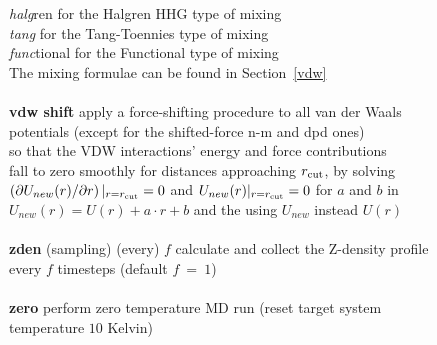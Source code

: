 \begin{tabbing}
\>                                              \> \phantom{x} {\em halg}ren for the Halgren HHG type of mixing \\
\>                                              \> \phantom{x} {\em tang} for the Tang-Toennies type of mixing \\
\>                                              \> \phantom{x} {\em func}tional for the Functional type of mixing \\
\>                                              \> The mixing formulae can be found in Section~\ref{vdw} \\
\>                                              \> \\
\> {\bf vdw shift}                              \> apply a force-shifting procedure to all van der Waals \\
\>                                              \> potentials (except for the shifted-force n-m and dpd ones) \\
\>                                              \> so that the VDW interactions' energy and force contributions \\
\>                                              \> fall to zero smoothly for distances approaching $r_{\rm cut}$, by solving \\
\>                                              \> $\left(\partial U_{new}(r) / \partial r \right)|_{r = r_{\rm cut}} = 0$ and $U_{new}(r)|_{r=r_{\rm cut}}= 0$ for $a$ and $b$ in \\
\>                                              \> $U_{new}(r) = U(r) + a \cdot r + b$ and the using $U_{new}$ instead $U(r)$ \\
\>                                              \> \\
\> {\bf zden} (sampling) (every) $f$            \> calculate and collect the Z-density profile \\
\>                                              \> every $f$ timesteps (default $f~=~1$) \\
\>                                              \> \\
\> {\bf zero}                                   \> perform zero temperature MD run (reset target system \\
\>                                              \> temperature $10$ Kelvin) \\
\>                                              \> \\
\>                                              \> \\

\end{tabbing}
